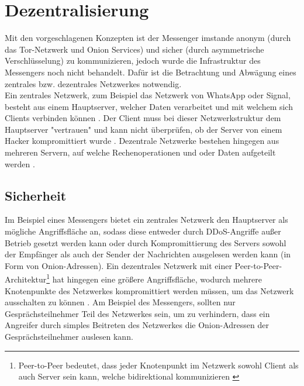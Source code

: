 \documentclass[a4paper,ngerman, headheight=28pt,12pt]{scrartcl}
\newcommand{\vcite}[1]{\cite[vgl.][]{#1}}
\begin{document}
\section{Dezentralisierung}
Mit den vorgeschlagenen Konzepten ist der Messenger imstande anonym (durch das Tor-Netzwerk und Onion Services) und sicher (durch asymmetrische Verschlüsselung) zu kommunizieren, jedoch wurde die Infrastruktur des Messengers noch nicht behandelt. Dafür ist die Betrachtung und Abwägung eines zentrales bzw. dezentrales Netzwerkes notwendig. \\
Ein zentrales Netzwerk, zum Beispiel das Netzwerk von WhatsApp oder Signal, besteht aus einem Hauptserver, welcher Daten verarbeitet und mit welchem sich Clients verbinden können \vcite{WhatsappCentralized,SignalCentralized, CentralizedDefinition}.
Der Client muss bei dieser Netzwerkstruktur dem Hauptserver "vertrauen" und kann nicht überprüfen, ob der Server von einem Hacker kompromittiert wurde \vcite{MessagingNetwork}. Dezentrale Netzwerke bestehen hingegen aus mehreren Servern, auf welche Rechenoperationen und oder Daten aufgeteilt werden \vcite{DecentralizedDefinition}.


\subsection{Sicherheit}
Im Beispiel eines Messengers bietet ein zentrales Netzwerk den Hauptserver als mögliche Angriffsfläche an, sodass diese entweder durch DDoS-Angriffe außer Betrieb gesetzt werden kann oder durch Kompromittierung des Servers sowohl der Empfänger als auch der Sender der Nachrichten ausgelesen werden kann (in Form von Onion-Adressen)\vcite{BSI-DDoS}.
Ein dezentrales Netzwerk mit einer Peer-to-Peer-Architektur\footnote{Peer-to-Peer bedeutet, dass jeder Knotenpunkt im Netzwerk sowohl Client als auch Server sein kann, welche bidirektional kommunizieren \vcite{PeerToPeerDef}} hat hingegen eine größere Angriffsfläche, wodurch mehrere Knotenpunkte des Netzwerkes kompromittiert werden müssen, um das Netzwerk ausschalten zu können \vcite{GeeksCenralizeDecentralized}.
Am Beispiel des Messengers, sollten nur Gesprächsteilnehmer Teil des Netzwerkes sein, um zu verhindern, dass ein Angreifer durch simples Beitreten des Netzwerkes die Onion-Adressen der Gesprächsteilnehmer auslesen kann.
\end{document}
